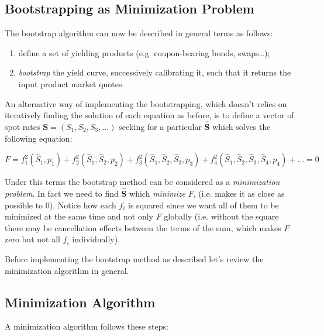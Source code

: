 \subsection{Bootstrapping as Minimization Problem}
\label{sec:bootstrap_as_minimization}
The bootstrap algorithm can now be described in general terms as follows:
\begin{enumerate}
\item define a set of yielding products (e.g. coupon-bearing bonds, swaps\ldots);
\item \emph{bootstrap} the yield curve, successively calibrating it, such that it returns the input product market quotes.
\end{enumerate}

An alternative way of implementing the bootstrapping, which doesn't relies on  iteratively finding the solution of each equation as before, is to define a vector of spot rates $\mathbf{S} = (S_1, S_2, S_3, \ldots)$ seeking for a particular $\mathbf{\hat{S}}$ which solves the following equation:

\begin{equation}
F = f_1^2(\hat{S}_1,p_1) + f_2^2(\hat{S}_1, \hat{S}_2,p_2) + f_3^2(\hat{S}_1, \hat{S}_2, \hat{S}_3,p_3) + f_4^2(\hat{S}_1, \hat{S}_2, \hat{S}_3, \hat{S}_4,p_4) + \ldots = 0
\label{eq:bootstrap_as_minimization}
\end{equation}

Under this terms the bootstrap method can be considered as a \emph{minimization problem}. In fact we need to find $\mathbf{\hat{S}}$ which \emph{minimize} $F$, (i.e. makes it as close as possible to 0).
Notice how each \(f_i\) is squared since we want all of them to be minimized at the same time and not only \(F\) globally (i.e. without the square there may be cancellation effects between the terms of the sum, which makes $F$ zero but not all $f_i$ individually).

Before implementing the bootstrap method as described let's review the minimization algorithm in general.

\subsection{Minimization Algorithm}
\label{minimization-algorithm}

A minimization algorithm follows these steps:

